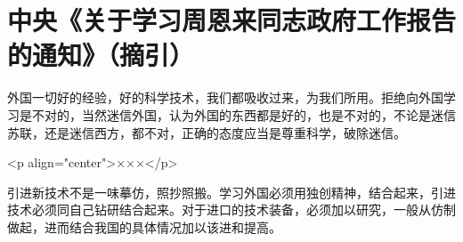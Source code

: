 \section[中央《关于学习周恩来同志政府工作报告的通知》（摘引）（一九六五年一月十四日）]{中央《关于学习周恩来同志政府工作报告的通知》（摘引）}


外国一切好的经验，好的科学技术，我们都吸收过来，为我们所用。拒绝向外国学习是不对的，当然迷信外国，认为外国的东西都是好的，也是不对的，不论是迷信苏联，还是迷信西方，都不对，正确的态度应当是尊重科学，破除迷信。

<p align="center">×××</p>

引进新技术不是一味摹仿，照抄照搬。学习外国必须用独创精神，结合起来，引进技术必须同自己钻研结合起来。对于进口的技术装备，必须加以研究，一般从仿制做起，进而结合我国的具体情况加以该进和提高。


